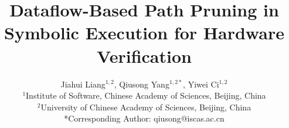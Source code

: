 \documentclass[conference]{IEEEtran}
\begin{document}
\title{Dataflow-Based Path Pruning in Symbolic Execution for Hardware Verification%
}

\IEEEspecialpapernotice{\vspace{-2em}}
\author{
Jiahui Liang$^{1,2}$, Qiusong Yang$^{1,2*}$, Yiwei Ci$^{1,2}$    \\
$^{1}$Institute of Software, Chinese Academy of Sciences, Beijing, China \\
$^{2}$University of Chinese Academy of Sciences, Beijing, China \\
*Corresponding Author: qiusong@iscas.ac.cn
}
\IEEEaftertitletext{}

\maketitle
\end{document}
